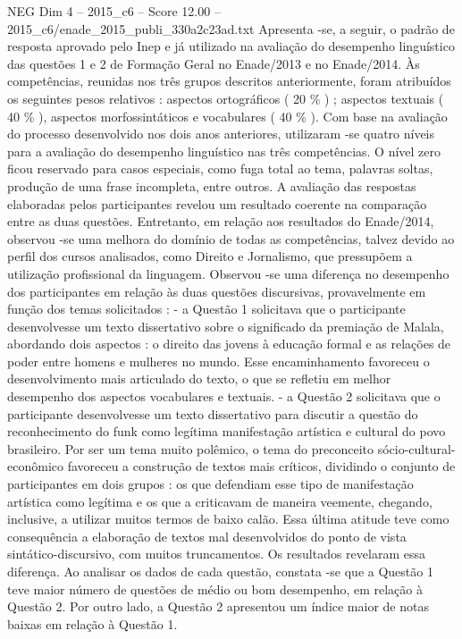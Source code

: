 \begin{textsample}{NEG Dim 4 – 2015\_c6 – Score 12.00 – 2015\_c6/enade\_2015\_publi\_330a2c23ad.txt}
Apresenta -se, a seguir, o padrão de resposta aprovado pelo Inep e já utilizado na avaliação do desempenho linguístico das questões 1 e 2 de Formação Geral no Enade/2013 e no Enade/2014.
Às competências, reunidas nos três grupos descritos anteriormente, foram atribuídos os seguintes pesos relativos : aspectos ortográficos ( 20 \% ) ; aspectos textuais ( 40 \% ), aspectos morfossintáticos e vocabulares ( 40 \% ).
Com base na avaliação do processo desenvolvido nos dois anos anteriores, utilizaram -se quatro níveis para a avaliação do desempenho linguístico nas três competências.
O nível zero ficou reservado para casos especiais, como fuga total ao tema, palavras soltas, produção de uma frase incompleta, entre outros.
A avaliação das respostas elaboradas pelos participantes revelou um resultado coerente na comparação entre as duas questões.
Entretanto, em relação aos resultados do Enade/2014, observou -se uma melhora do domínio de todas as competências, talvez devido ao perfil dos cursos analisados, como Direito e Jornalismo, que pressupõem a utilização profissional da linguagem.
Observou -se uma diferença no desempenho dos participantes em relação às duas questões discursivas, provavelmente em função dos temas solicitados : - a Questão 1 solicitava que o participante desenvolvesse um texto dissertativo sobre o significado da premiação de Malala, abordando dois aspectos : o direito das jovens à educação formal e as relações de poder entre homens e mulheres no mundo.
Esse encaminhamento favoreceu o desenvolvimento mais articulado do texto, o que se refletiu em melhor desempenho dos aspectos vocabulares e textuais. - a Questão 2 solicitava que o participante desenvolvesse um texto dissertativo para discutir a questão do reconhecimento do funk como legítima manifestação artística e cultural do povo brasileiro.
Por ser um tema muito polêmico, o tema do preconceito sócio-cultural-econômico favoreceu a construção de textos mais críticos, dividindo o conjunto de participantes em dois grupos : os que defendiam esse tipo de manifestação artística como legítima e os que a criticavam de maneira veemente, chegando, inclusive, a utilizar muitos termos de baixo calão.
Essa última atitude teve como consequência a elaboração de textos mal desenvolvidos do ponto de vista sintático-discursivo, com muitos truncamentos.
Os resultados revelaram essa diferença.
Ao analisar os dados de cada questão, constata -se que a Questão 1 teve maior número de questões de médio ou bom desempenho, em relação à Questão 2.
Por outro lado, a Questão 2 apresentou um índice maior de notas baixas em relação à Questão 1.

\end{textsample}
